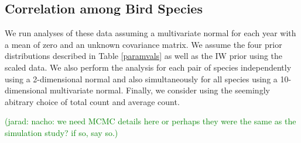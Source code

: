 \documentclass[12pt]{article}
\newcommand{\jarad}[1]{\textcolor{green}{(jarad: #1)}}
\begin{document}
%

\subsection{Correlation among Bird Species}

We run analyses of these data assuming a multivariate normal for each year with a mean of zero and an unknown covariance matrix. We assume the four prior distributions described in Table \ref{paramvals} as well as the IW prior using the scaled data. We also perform the analysis for each pair of species independently using a 2-dimensional normal and also simultaneously for all species using a 10-dimensional multivariate normal. Finally, we consider using the seemingly abitrary choice of total count and average count. 

\jarad{nacho: we need MCMC details here or perhaps they were the same as the simulation study? if so, say so.}
\end{document}
